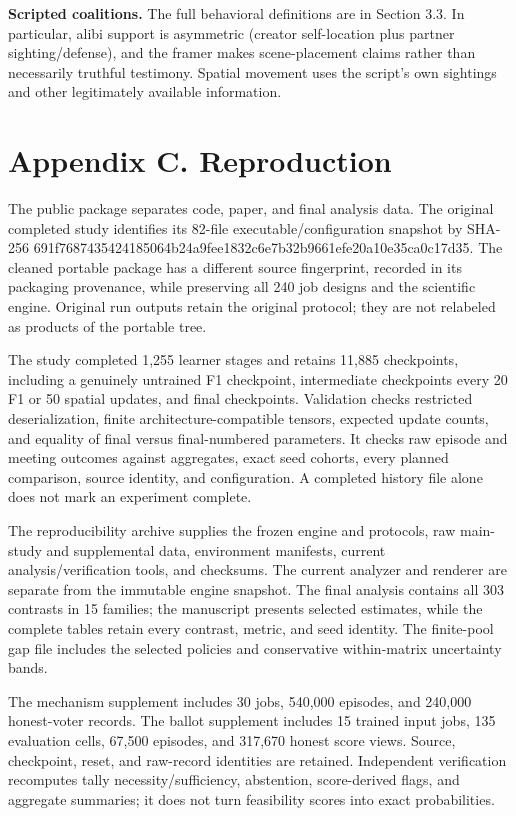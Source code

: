 \documentclass[
  12pt,
]{article}
\begin{document}
\textbf{Scripted coalitions.} The full behavioral definitions are in
Section 3.3. In particular, alibi support is asymmetric (creator
self-location plus partner sighting/defense), and the framer makes
scene-placement claims rather than necessarily truthful testimony.
Spatial movement uses the script's own sightings and other legitimately
available information.

\FloatBarrier

\section*{Appendix C. Reproduction}\label{appendix-c.-reproduction}

The public package separates code, paper, and final analysis data. The
original completed study identifies its 82-file executable/configuration
snapshot by SHA-256
691f7687435424185064b24a9fee1832c6e7b32b9661efe20a10e35ca0c17d35. The
cleaned portable package has a different source fingerprint, recorded in
its packaging provenance, while preserving all 240 job designs and the
scientific engine. Original run outputs retain the original protocol;
they are not relabeled as products of the portable tree.

The study completed 1,255 learner stages and retains 11,885 checkpoints,
including a genuinely untrained F1 checkpoint, intermediate checkpoints
every 20 F1 or 50 spatial updates, and final checkpoints. Validation
checks restricted deserialization, finite architecture-compatible
tensors, expected update counts, and equality of final versus
final-numbered parameters. It checks raw episode and meeting outcomes
against aggregates, exact seed cohorts, every planned comparison, source
identity, and configuration. A completed history file alone does not
mark an experiment complete.

The reproducibility archive supplies the frozen engine and protocols,
raw main-study and supplemental data, environment manifests, current
analysis/verification tools, and checksums. The current analyzer and
renderer are separate from the immutable engine snapshot. The final
analysis contains all 303 contrasts in 15 families; the manuscript
presents selected estimates, while the complete tables retain every
contrast, metric, and seed identity. The finite-pool gap file includes
the selected policies and conservative within-matrix uncertainty bands.

The mechanism supplement includes 30 jobs, 540,000 episodes, and 240,000
honest-voter records. The ballot supplement includes 15 trained input
jobs, 135 evaluation cells, 67,500 episodes, and 317,670 honest score
views. Source, checkpoint, reset, and raw-record identities are
retained. Independent verification recomputes tally
necessity/sufficiency, abstention, score-derived flags, and aggregate
summaries; it does not turn feasibility scores into exact probabilities.
\end{document}

